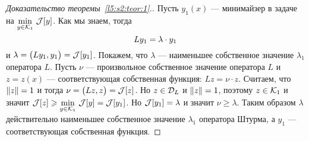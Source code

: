 \begin{proof}[Доказательство теоремы~\ref{l5:s2:teor:1}.]
	
	Пусть $y_1(x)$ --- минимайзер в задаче на $\min\limits_{y\in\mathcal{K}_1}\,\mathcal{J}[y]$. Как мы знаем, тогда 
	\begin{equation*}
		\hfill Ly_1=\lambda\cdot y_1\hfill
	\end{equation*} 
	и $\lambda=\big(Ly_1,y_1\big)=\mathcal{J}[y_1]$. Покажем, что $\lambda$ --- наименьшее собственное значение $\lambda_1$ оператора $L$. Пусть $\nu$ --- произвольное собственное значение оператора $L$ и $z=z(x)$ --- соответствующая собственная функция: $Lz=\nu\cdot z$. Считаем, что $\left\|z\right\|=1$ и тогда $\nu=\big(Lz,z\big)=\mathcal{J}[z]$. Но $z\in\mathcal{D}_{L}$ и $\left\|z\right\|=1$, поэтому $z\in\mathcal{K}_1$ и значит $\mathcal{J}[z]\geqslant\min\limits_{y\in\mathcal{K}_1}\,\mathcal{J}[y]=\mathcal{J}[y_1]$. Но $\mathcal{J}[y_1]=\lambda$ и значит $\nu\geqslant\lambda$. Таким образом $\lambda$ действительно наименьшее собственное значение $\lambda_1$ оператора Штурма, а $y_1$ --- соответствующая собственная функция.
\end{proof}

